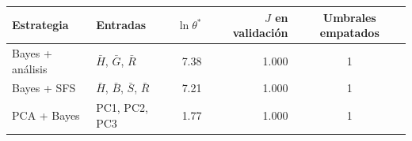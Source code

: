 \footnotesize
\begin{tabular}{llrrc}
\toprule
Estrategia & Entradas & $\ln\theta^*$ & $J$ en validación & Umbrales empatados \\
\midrule
Bayes + análisis & $\bar H$, $\bar G$, $\bar R$ & 7.38 & 1.000 & 1 \\
Bayes + SFS & $\bar H$, $\bar B$, $\bar S$, $\bar R$ & 7.21 & 1.000 & 1 \\
PCA + Bayes & PC1, PC2, PC3 & 1.77 & 1.000 & 1 \\
\bottomrule
\end{tabular}

